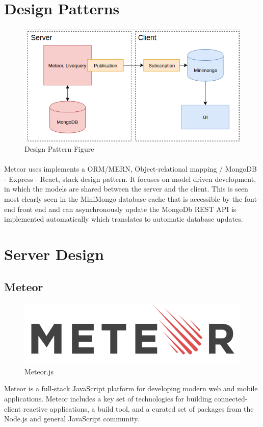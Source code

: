 \documentclass[12pt,a4paper]{report}
\begin{document}
	\section { Design Patterns }
	
	\begin{figure}[h]
		\includegraphics[scale=.7]{orm.png}
		\caption{Design Pattern Figure}
		\label{fig: Dasign Pattern }
	\end{figure}
	
	\paragraph{} Meteor uses implements a ORM/MERN, Object-relational mapping / MongoDB - Express - React, stack design pattern. It focuses on model driven development, in which the models are shared between the server and the client. This is seen most clearly seen in the MiniMongo database cache that is accessible by the font-end front end and can asynchronously update the MongoDb REST API is implemented automatically which translates to automatic database updates.
	
	
	
	\newpage
	\section {Server Design}
	\subsection{Meteor}
	\begin{figure}
		\includegraphics[scale=.2]{meteorJS}
		\caption{Meteor.js}
		\label{fig: Meteor.js}
	\end{figure}
	Meteor is a full-stack JavaScript platform for developing modern web and mobile applications. Meteor includes a key set of technologies for building connected-client reactive applications, a build tool, and a curated set of packages from the Node.js and general JavaScript community.
	
\end{document}
